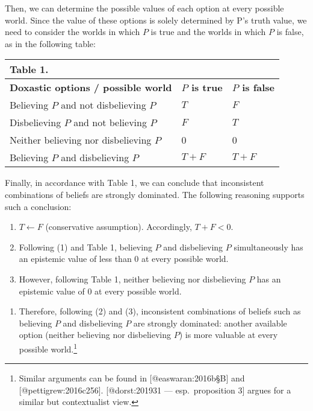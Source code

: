 \documentclass[
]{article}
\providecommand{\tightlist}{%
  \setlength{\itemsep}{0pt}\setlength{\parskip}{0pt}}
\begin{document}
Then, we can determine the possible values of each option at every
possible world. Since the value of these options is solely determined by
P's truth value, we need to consider the worlds in which \(P\) is true
and the worlds in which \(P\) is false, as in the following table:

\begin{longtable}[]{@{}lll@{}}
\toprule
Table 1. & & \\
\midrule
\endhead
\textbf{Doxastic options / possible world} & \textbf{\(P\) is true} &
\textbf{\(P\) is false} \\
Believing \(P\) and not disbelieving \(P\) & \(T\) & \(F\) \\
Disbelieving \(P\) and not believing \(P\) & \(F\) & \(T\) \\
Neither believing nor disbelieving \(P\) & 0 & 0 \\
Believing \(P\) and disbelieving \(P\) & \(T+F\) & \(T+F\) \\
\bottomrule
\end{longtable}

Finally, in accordance with Table 1, we can conclude that inconsistent
combinations of beliefs are strongly dominated. The following reasoning
supports such a conclusion:

\begin{enumerate}
\def\labelenumi{(\arabic{enumi})}
\item
  \(T \leftarrow F\) (conservative assumption). Accordingly,
  \(T+F < 0\).
\item
  Following (1) and Table 1, believing \(P\) and disbelieving \(P\)
  simultaneously has an epistemic value of less than 0 at every possible
  world.
\item
  However, following Table 1, neither believing nor disbelieving \(P\)
  has an epistemic value of 0 at every possible world.
\end{enumerate}

\begin{enumerate}
\def\labelenumi{(\Alph{enumi})}
\setcounter{enumi}{2}
\tightlist
\item
  Therefore, following (2) and (3), inconsistent combinations of beliefs
  such as believing \(P\) and disbelieving \(P\) are strongly dominated:
  another available option (neither believing nor disbelieving \(P\)) is
  more valuable at every possible world.\footnote{Similar arguments can
    be found in {[}@easwaran:2016b§B{]} and {[}@pettigrew:2016c256{]}.
    {[}@dorst:201931 --- esp.~proposition 3{]} argues for a similar but
    contextualist view.}
\end{enumerate}
\end{document}
